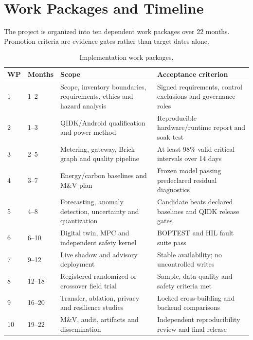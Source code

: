 \section{Work Packages and Timeline}

The project is organized into ten dependent work packages over 22 months. Promotion criteria are evidence gates rather than target dates alone.

\begin{table}[t]
	\centering
	\caption{Implementation work packages.}
	\label{tab:work-packages}
	\begin{tabularx}{\textwidth}{p{}p{}p{}X}
		\toprule
		WP & Months & Scope                                                                 & Acceptance criterion                                         \\
		\midrule
		1  & 1--2   & Scope, inventory boundaries, requirements, ethics and hazard analysis & Signed requirements, control exclusions and governance roles \\
		2  & 1--3   & QIDK/Android qualification and power method                           & Reproducible hardware/runtime report and soak test           \\
		3  & 2--5   & Metering, gateway, Brick graph and quality pipeline                   & At least 98\% valid critical intervals over 14 days          \\
		4  & 3--7   & Energy/carbon baselines and M\&V plan                                 & Frozen model passing predeclared residual diagnostics        \\
		5  & 4--8   & Forecasting, anomaly detection, uncertainty and quantization          & Candidate beats declared baselines and QIDK release gates    \\
		6  & 6--10  & Digital twin, MPC and independent safety kernel                       & BOPTEST and HIL fault suite pass                             \\
		7  & 9--12  & Live shadow and advisory deployment                                   & Stable availability; no uncontrolled writes                  \\
		8  & 12--18 & Registered randomized or crossover field trial                        & Sample, data quality and safety criteria met                 \\
		9  & 16--20 & Transfer, ablation, privacy and resilience studies                    & Locked cross-building and backend comparisons                \\
		10 & 19--22 & M\&V, audit, artifacts and dissemination                              & Independent reproducibility review and final release         \\
		\bottomrule
	\end{tabularx}
\end{table}

